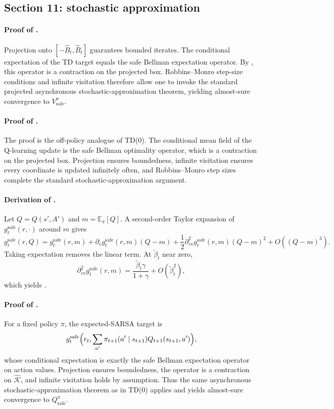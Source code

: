 \documentclass{article}
\theoremstyle{remark}
\newcommand{\E}{\mathbb{E}}
\newcommand{\safe}{\mathrm{safe}}
\newcommand{\Ksafe}{\widehat{\mathcal K}}
\newcommand{\Bhat}{\widehat B}
\begin{document}
\subsection{Section 11: stochastic approximation}
\label{app:stochastic}

\paragraph{Proof of .}
Projection onto $[-\Bhat_t,\Bhat_t]$ guarantees bounded iterates.
The conditional expectation of the TD target equals the safe Bellman expectation operator.
By , this operator is a contraction on the projected box.
Robbins--Monro step-size conditions and infinite visitation therefore allow one to invoke the standard projected asynchronous stochastic-approximation theorem, yielding almost-sure convergence to $V_\safe^\pi$.

\paragraph{Proof of .}
The proof is the off-policy analogue of TD(0).
The conditional mean field of the Q-learning update is the safe Bellman optimality operator, which is a contraction on the projected box.
Projection ensures boundedness, infinite visitation ensures every coordinate is updated infinitely often, and Robbins--Monro step sizes complete the standard stochastic-approximation argument.

\paragraph{Derivation of .}
Let $Q=Q(s',A')$ and $m=\E_\pi[Q]$.
A second-order Taylor expansion of $g_t^{\safe}(r,\cdot)$ around $m$ gives
\[
g_t^{\safe}(r,Q)=g_t^{\safe}(r,m)+\partial_v g_t^{\safe}(r,m)(Q-m)+\frac{1}{2}\partial_{vv}^2 g_t^{\safe}(r,m)(Q-m)^2+O((Q-m)^3).
\]
Taking expectation removes the linear term.
At $\widetilde\beta_t$ near zero,
\[
\partial_{vv}^2 g_t^{\safe}(r,m)=\frac{\widetilde\beta_t\gamma}{1+\gamma}+O(\widetilde\beta_t^2),
\]
which yields .

\paragraph{Proof of .}
For a fixed policy $\pi$, the expected-SARSA target is
\[
g_t^{\safe}\Bigl(r_t,\sum_{a'}\pi_{t+1}(a'\mid s_{t+1})Q_{t+1}(s_{t+1},a')\Bigr),
\]
whose conditional expectation is exactly the safe Bellman expectation operator on action values.
Projection ensures boundedness, the operator is a contraction on $\Ksafe$, and infinite visitation holds by assumption.
Thus the same asynchronous stochastic-approximation theorem as in TD(0) applies and yields almost-sure convergence to $Q_\safe^\pi$.
\end{document}
